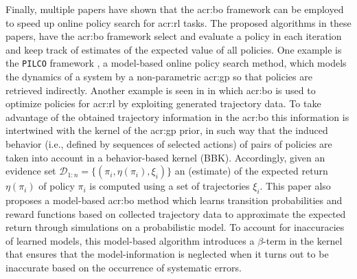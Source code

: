 Finally, multiple papers have shown that the \acrshort{acr:bo} framework can be employed to speed up online policy search for \acrshort{acr:rl} tasks.
The proposed algorithms in these papers, have the \acrshort{acr:bo} framework select and evaluate a policy in each iteration and keep track of estimates of the expected value of all policies.
One example is the \texttt{PILCO} framework \cite{deisenroth2011pilco}, a model-based online policy search method, which models the dynamics of a system by a non-parametric \acrshort{acr:gp} so that policies are retrieved indirectly.
Another example is seen in \cite{wilson2014using} in which \acrlong{acr:bo} is used to optimize policies for \acrshort{acr:rl} by exploiting generated trajectory data.
To take advantage of the obtained trajectory information in the \acrlong{acr:bo} this information is intertwined with the kernel of the \acrshort{acr:gp} prior, in such way that the induced behavior (i.e., defined by sequences of selected actions) of pairs of policies are taken into account in a behavior-based kernel (BBK).
Accordingly, given an evidence set $\mathcal{D}_{1:n} = \{(\pi_i, \eta(\pi_i), \xi_i)\}$ an (estimate) of the expected return $\eta(\pi_i)$ of policy $\pi_i$ is computed using a set of trajectories $\xi_i$.
This paper also proposes a model-based \acrlong{acr:bo} method which learns transition probabilities and reward functions based on collected trajectory data to approximate the expected return through simulations on a probabilistic model.
To account for inaccuracies of learned models, this model-based algorithm introduces a $\beta$-term in the kernel that ensures that the model-information is neglected when it turns out to be inaccurate based on the occurrence of systematic errors.

